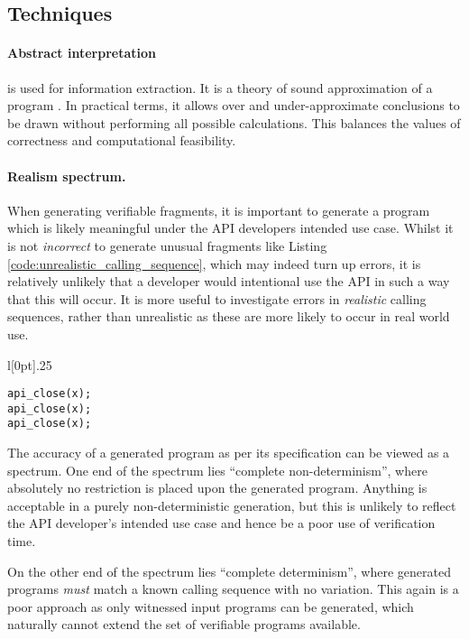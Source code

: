 \documentclass[EPiC]{easychair}
\begin{document}
\subsection{Techniques}
\paragraph{Abstract interpretation} is used for information extraction.  It is a theory of sound approximation of a program \cite{DBLP:conf/popl/CousotC77}. In practical terms, it allows over and under-approximate conclusions to be drawn without performing all possible calculations.  This balances the values of correctness and computational feasibility. 


\paragraph{Realism spectrum.}
\label{sec:realism_spectrum}
When generating verifiable fragments, it is important to generate a program which is likely meaningful under the API developers intended use case.  Whilst it is not \textit{incorrect} to generate unusual fragments like Listing \ref{code:unrealistic_calling_sequence}, which may indeed turn up errors, it is relatively unlikely that a developer would intentional use the API in such a way that this will occur.  It is more useful to investigate errors in \textit{realistic} calling sequences, rather than unrealistic as these are more likely to occur in real world use. 


\begin{wrapfigure}[7]{l}[0pt]{.25\textwidth}
	\begin{lstlisting}[caption={An unrealistic calling sequence.}, numbers=none, label={code:unrealistic_calling_sequence}]
api_close(x);
api_close(x);
api_close(x);
	\end{lstlisting}
\end{wrapfigure}

The accuracy of a generated program as per its specification can be viewed as a spectrum.  One end of the spectrum lies \enquote{complete non-determinism}, where absolutely no restriction is placed upon the generated program.  Anything is acceptable in a purely non-deterministic generation, but this is unlikely to reflect the API developer's intended use case and hence be a poor use of verification time.

On the other end of the spectrum lies \enquote{complete determinism}, where generated programs \textit{must} match a known calling sequence with no variation.  This again is a poor approach as only witnessed input programs can be generated, which naturally cannot extend the set of verifiable programs available.
\end{document}
